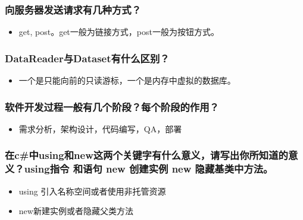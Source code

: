 \documentclass[9pt, b5paper]{article}
\begin{document}
\subsubsection{向服务器发送请求有几种方式？}
\label{sec-1-1-59}
\begin{itemize}
\item get, post。get一般为链接方式，post一般为按钮方式。
\end{itemize}
\subsubsection{DataReader与Dataset有什么区别？}
\label{sec-1-1-60}
\begin{itemize}
\item 一个是只能向前的只读游标，一个是内存中虚拟的数据库。
\end{itemize}
\subsubsection{软件开发过程一般有几个阶段？每个阶段的作用？}
\label{sec-1-1-61}
\begin{itemize}
\item 需求分析，架构设计，代码编写，QA，部署
\end{itemize}
\subsubsection{在c\#中using和new这两个关键字有什么意义，请写出你所知道的意义？using指令 和语句 new 创建实例 new 隐藏基类中方法。}
\label{sec-1-1-62}
\begin{itemize}
\item using 引入名称空间或者使用非托管资源
\item new新建实例或者隐藏父类方法
\end{itemize}
\end{document}
